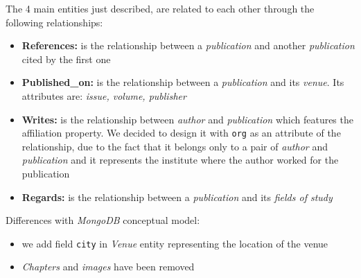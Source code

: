 \documentclass{Configuration_Files/PoliMi3i_thesis}
\begin{document}
\bigskip
The 4 main entities just described, are related to each other through the following relationships:
\begin{itemize}
    \item \textbf{References:} is the relationship between a \emph{publication} and another \emph{publication} cited by the first one
    \item \textbf{Published\_on:} is the relationship between a \emph{publication} and its \emph{venue}. Its attributes are: \emph{ issue, volume, publisher}
    \item \textbf{Writes:} is the relationship between \emph{author} and \emph{publication} which features the affiliation property.
        We decided to design it with \verb |org| as an attribute of the relationship, due to the fact that it belongs
        only to a pair of \emph{author} and \emph{publication} and it represents the institute where the author worked for the publication
    \item \textbf{Regards:} is the relationship between a \emph{publication} and its \emph{fields of study}
\end{itemize}

\bigskip
Differences with \emph{MongoDB} conceptual model:
\begin{itemize}
\item we add field \verb |city| in \emph{Venue} entity representing the location of the venue
\item \emph{Chapters} and \emph{images} have been removed
\end{itemize}
\end{document}
